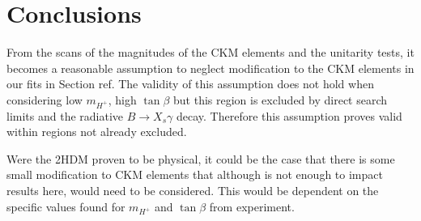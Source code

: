 \documentclass[11pt]{article}
\begin{document}
\section{Conclusions}
From the scans of the magnitudes of the CKM elements and the unitarity tests, it becomes a reasonable assumption to neglect modification to the CKM elements in our fits in Section ref.
The validity of this assumption does not hold when considering low $m_{H^+}$, high $\tan\beta$ but this region is excluded by direct search limits and the radiative $B\to X_s\gamma$ decay. 
Therefore this assumption proves valid within regions not already excluded. 

Were the 2HDM proven to be physical, it could be the case that there is some small modification to CKM elements that although is not enough to impact results here, would need to be considered. 
This would be dependent on the specific values found for $m_{H^+}$ and $\tan\beta$ from experiment.
\end{document}
